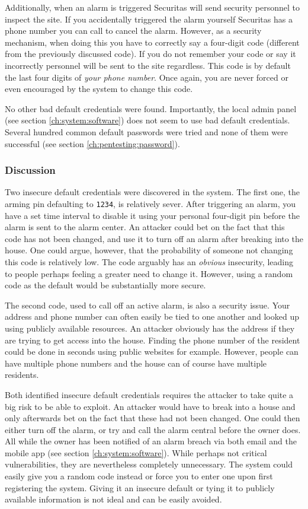 Additionally, when an alarm is triggered Securitas will send security personnel to inspect the site. If you accidentally triggered the alarm yourself Securitas has a phone number you can call to cancel the alarm. However, as a security mechanism, when doing this you have to correctly say a four-digit code (different from the previously discussed code). If you do not remember your code or say it incorrectly personnel will be sent to the site regardless. This code is by default the last four digits of \textit{your phone number}. Once again, you are never forced or even encouraged by the system to change this code.

No other bad default credentials were found. Importantly, the local admin panel (see section \ref{ch:system:software}) does not seem to use bad default credentials. Several hundred common default passwords were tried and none of them were successful (see section \ref{ch:pentesting:password}).

\subsubsection{Discussion}
Two insecure default credentials were discovered in the system. The first one, the arming pin defaulting to \texttt{1234}, is relatively sever. After triggering an alarm, you have a set time interval to disable it using your personal four-digit pin before the alarm is sent to the alarm center. An attacker could bet on the fact that this code has not been changed, and use it to turn off an alarm after breaking into the house. One could argue, however, that the probability of someone not changing this code is relatively low. The code arguably has an \textit{obvious} insecurity, leading to people perhaps feeling a greater need to change it. However, using a random code as the default would be substantially more secure.

The second code, used to call off an active alarm, is also a security issue. Your address and phone number can often easily be tied to one another and looked up using publicly available resources. An attacker obviously has the address if they are trying to get access into the house. Finding the phone number of the resident could be done in seconds using public websites for example. However, people can have multiple phone numbers and the house can of course have multiple residents.

Both identified insecure default credentials requires the attacker to take quite a big risk to be able to exploit. An attacker would have to break into a house and only afterwards bet on the fact that these had not been changed. One could then either turn off the alarm, or try and call the alarm central before the owner does. All while the owner has been notified of an alarm breach via both email and the mobile app (see section \ref{ch:system:software}). While perhaps not critical vulnerabilities, they are nevertheless completely unnecessary. The system could easily give you a random code instead or force you to enter one upon first registering the system. Giving it an insecure default or tying it to publicly available information is not ideal and can be easily avoided.
